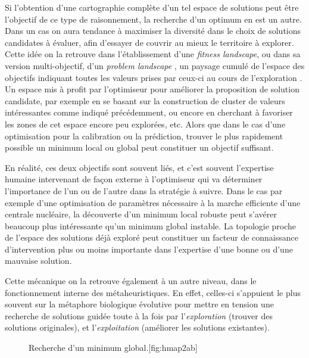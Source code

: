 Si l'obtention d'une cartographie complète d'un tel espace de solutions peut être l'objectif de ce type de raisonnement, la recherche d'un optimum en est un autre. Dans un cas on aura tendance à maximiser la diversité dans le choix de solutions candidates à évaluer, afin d'essayer de couvrir au mieux le territoire à explorer. Cette idée on la retrouve dans l'établissement d'une \textit{fitness landscape}, ou dans sa version multi-objectif, d'un \textit{problem landscape} \autocite[93-94]{Weise2011}, un paysage cumulé de l'espace des objectifs indiquant toutes les valeurs prises par ceux-ci au cours de l'exploration . Un espace mis à profit par l'optimiseur pour améliorer la proposition de solution candidate, par exemple en se basant sur la construction de cluster de valeurs intéressantes comme indiqué précédemment, ou encore en cherchant à favoriser les zones de cet espace encore peu explorées, etc. Alors que dans le cas d'une optimisation pour la calibration ou la prédiction, trouver le plus rapidement possible un minimum local ou global peut constituer un objectif suffisant.

En réalité, ces deux objectifs sont souvent liés, et c'est souvent l'expertise humaine intervenant de façon externe à l'optimiseur qui va déterminer l'importance de l'un ou de l'autre dans la stratégie à suivre. Dans le cas par exemple d'une optimisation de paramètres nécessaire à la marche efficiente d'une centrale nucléaire, la découverte d'un minimum local robuste peut s'avérer beaucoup plus intéressante qu'un minimum global instable. La topologie proche de l'espace des solutions déjà exploré peut constituer un facteur de connaissance d'intervention plus ou moins importante dans l'expertise d'une bonne ou d'une mauvaise solution.

Cette mécanique on la retrouve également à un autre niveau, dans le fonctionnement interne des métaheuristiques. En effet, celles-ci s'appuient le plus souvent sur la métaphore biologique évolutive pour mettre en tension une recherche de solutions guidée toute à la fois par l'\textit{exploration} (trouver des solutions originales), et l'\textit{exploitation} (améliorer les solutions existantes).

\begin{figure}[!htbp]
\begin{sidecaption}{Recherche d'un minimum global.}[fig:hmap2ab]
 \centering
 \qquad
\end{sidecaption}
\end{figure}

